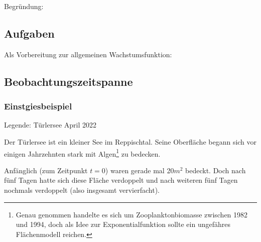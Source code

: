 Begründung:
\newpage


\subsection*{Aufgaben}



  Als Vorbereitung zur allgemeinen Wachstumsfunktion:

\newpage


\subsection{Beobachtungszeitspanne}
\subsubsection{Einstgiesbeispiel}
\begin{center}{\small Legende: Türlersee April 2022}\end{center}

Der Türlersee ist ein kleiner See im Reppischtal. Seine Oberfläche
begann sich vor einigen Jahrzehnten stark mit Algen\footnote{Genau
  genommen handelte es sich um Zooplanktonbiomasse zwischen 1982 und 1994, doch als
  Idee zur Exponentialfunktion sollte ein ungefähres Flächenmodell reichen.} zu bedecken.

Anfänglich (zum Zeitpunkt $t=0$) waren gerade mal 20$m^2$ bedeckt. Doch nach fünf Tagen hatte sich diese Fläche verdoppelt und nach weiteren fünf Tagen nochmals verdoppelt (also insgesamt vervierfacht).


